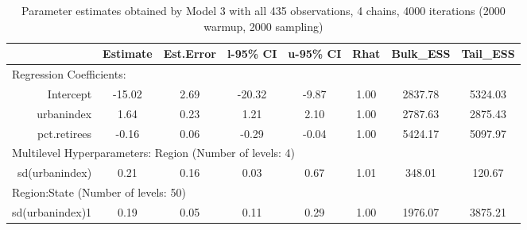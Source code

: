 \documentclass[12pt]{article}
\begin{document}
\begin{table}[h!]
	\centering
	\caption{Parameter estimates obtained by Model 3 with all 435 observations, 4 chains, 4000 iterations (2000 warmup, 2000 sampling)}
	\label{tab:model3}
	\begin{adjustbox}{max width=\textwidth}
	\begin{tabular}{rccccccc}
		\hline
		& Estimate & Est.Error & l-95\% CI & u-95\% CI & Rhat & Bulk\_ESS & Tail\_ESS \\ 
		\hline
		 \multicolumn{8}{l}{Regression Coefficients:} \\
		Intercept & -15.02 & 2.69 & -20.32 & -9.87 & 1.00 & 2837.78 & 5324.03 \\ 
		urbanindex & 1.64 & 0.23 & 1.21 & 2.10 & 1.00 & 2787.63 & 2875.43 \\ 
		pct.retirees & -0.16 & 0.06 & -0.29 & -0.04 & 1.00 & 5424.17 & 5097.97 \\
		\midrule
		\multicolumn{8}{l}{Multilevel Hyperparameters: Region (Number of levels: 4)} \\ 
		sd(urbanindex) & 0.21 & 0.16 & 0.03 & 0.67 & 1.01 & 348.01 & 120.67 \\ 
		\midrule
		\multicolumn{8}{l}{Region:State (Number of levels: 50)}  \\
		sd(urbanindex)1 & 0.19 & 0.05 & 0.11 & 0.29 & 1.00 & 1976.07 & 3875.21 \\ 
		\hline
	\end{tabular}
	\end{adjustbox}
	
\end{table}
\end{document}
